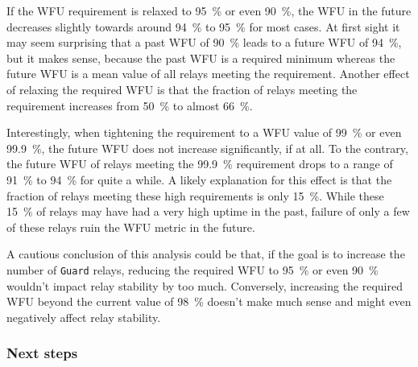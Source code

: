 \documentclass{article}
\begin{document}
If the WFU requirement is relaxed to 95~\% or even 90~\%, the WFU in the
future decreases slightly towards around 94~\% to 95~\% for most cases.
At first sight it may seem surprising that a past WFU of 90~\% leads to
a future WFU of 94~\%, but it makes sense, because the past WFU is a
required minimum whereas the future WFU is a mean value of all relays
meeting the requirement.
Another effect of relaxing the required WFU is that the fraction of relays
meeting the requirement increases from 50~\% to almost 66~\%.

Interestingly, when tightening the requirement to a WFU value of 99~\% or
even 99.9~\%, the future WFU does not increase significantly, if at all.
To the contrary, the future WFU of relays meeting the 99.9~\% requirement
drops to a range of 91~\% to 94~\% for quite a while.
A likely explanation for this effect is that the fraction of relays
meeting these high requirements is only 15~\%.
While these 15~\% of relays may have had a very high uptime in the past,
failure of only a few of these relays ruin the WFU metric in the future.

A cautious conclusion of this analysis could be that, if the goal is to
increase the number of \texttt{Guard} relays, reducing the required WFU to
95~\% or even 90~\% wouldn't impact relay stability by too much.
Conversely, increasing the required WFU beyond the current value of 98~\%
doesn't make much sense and might even negatively affect relay stability.

\subsubsection*{Next steps}
\end{document}
